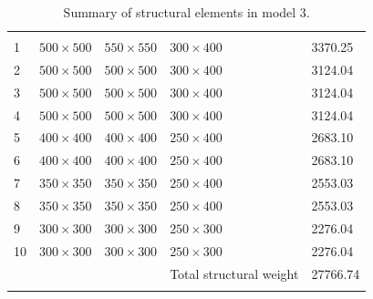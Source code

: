 \documentclass{cup-pan}
\begin{document}
\renewcommand{\arraystretch}{1}
\begin{longtable}{P{0.5in} P{1in} P{1in} P{1in} P{1in}}
\caption{Summary of structural elements in model 3.} \\
\headrow {} &  &  &  &  \\
1 & $500 \times 500$ & $550 \times 550$ & $300 \times 400$ & \num{3370.25} \\
2 & $500 \times 500$ & $500 \times 500$ & $300 \times 400$ & \num{3124.04} \\
3 & $500 \times 500$ & $500 \times 500$ & $300 \times 400$ & \num{3124.04} \\
4 & $500 \times 500$ & $500 \times 500$ & $300 \times 400$ & \num{3124.04} \\
5 & $400 \times 400$ & $400 \times 400$ & $250 \times 400$ & \num{2683.10} \\
6 & $400 \times 400$ & $400 \times 400$ & $250 \times 400$ & \num{2683.10} \\
7 & $350 \times 350$ & $350 \times 350$ & $250 \times 400$ & \num{2553.03} \\
8 & $350 \times 350$ & $350 \times 350$ & $250 \times 400$ & \num{2553.03} \\
9 & $300 \times 300$ & $300 \times 300$ & $250 \times 300$ & \num{2276.04} \\
10 & $300 \times 300$ & $300 \times 300$ & $250 \times 300$ & \num{2276.04} \\
 &  & & Total structural weight & \num{27766.74} \\
\label{tab:cross section model 3}
\end{longtable}
\end{document}
